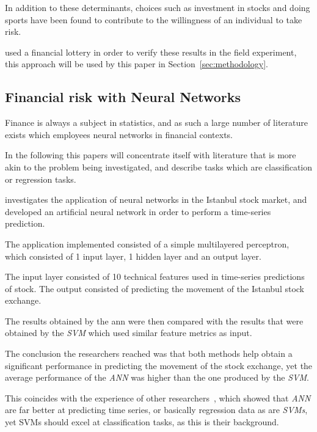 \documentclass[12pt]{article}
\begin{document}
In addition to these determinants, choices such as investment in stocks and doing sports have been found to contribute to the willingness of an individual to take risk.

\citet{individualRiskAttitudes} used a financial lottery in order to verify these results in the field experiment, this approach will be used by this paper in Section~\ref{sec:methodology}.


\subsection{Financial risk with Neural Networks}
\label{sub:financial_risk_nn}

Finance is always a subject in statistics, and as such a large number of literature exists which employees neural networks in financial contexts. 

In the following this papers will concentrate itself with literature that is more akin to the problem being investigated, and describe tasks which are classification or regression tasks.

\citet{instanbulStock} investigates the application of neural networks in the Istanbul stock market, and developed an artificial neural network in order to perform a time-series prediction. 

The application implemented consisted of a simple multilayered perceptron, which consisted of 1 input layer, 1 hidden layer and an output layer. 

The input layer consisted of 10 technical features used in time-series predictions of stock. The output consisted of predicting the movement of the Istanbul stock exchange.

The results obtained by the \gls{ann} were then compared with the results that were obtained by the \emph{SVM} which used similar feature metrics as input. 

The conclusion the researchers reached was that both methods help obtain a significant performance in predicting the movement of the stock exchange, yet the average performance of the \emph{ANN} was higher than the one produced by the \emph{SVM}. 

This coincides with the experience of other researchers~\citep{equivalence,caruana.icml06.pdf}, which showed that \emph{ANN} are far better at predicting time series, or basically regression data as are \emph{SVMs}, yet SVMs should excel at classification tasks, as this is their background.
\end{document}
